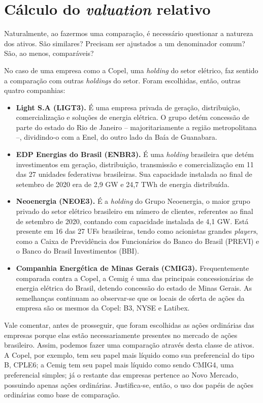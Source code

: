 \documentclass[grad,numbers]{coppe}
\providecommand{\tightlist}{%
  \setlength{\itemsep}{0pt}\setlength{\parskip}{0pt}}
\begin{document}
  \hypertarget{cuxe1lculo-do-valuation-relativo}{%
  \section{\texorpdfstring{Cálculo do \emph{valuation} relativo}{Cálculo do valuation relativo}}\label{cuxe1lculo-do-valuation-relativo}}

  Naturalmente, ao fazermos uma comparação, é necessário questionar a natureza dos ativos. São similares? Precisam ser ajustados a um denominador comum? São, ao menos, comparáveis?

  No caso de uma empresa como a Copel, uma \emph{holding} do setor elétrico, faz sentido a comparação com outras \emph{holdings} do setor. Foram escolhidas, então, outras quatro companhias:
  \begin{itemize}
  \tightlist
  \item
    \textbf{Light S.A (LIGT3).} É uma empresa privada de geração, distribuição, comercialização e soluções de energia elétrica. O grupo detém concessão de parte do estado do Rio de Janeiro -- majoritariamente a região metropolitana --, dividindo-o com a Enel, do outro lado da Baía de Guanabara.
  \item
    \textbf{EDP Energias do Brasil (ENBR3).} É uma \emph{holding} brasileira que detém investimentos em geração, distribuição, transmissão e comercialização em 11 das 27 unidades federativas brasileiras. Sua capacidade instalada ao final de setembro de 2020 era de 2,9 GW e 24,7 TWh de energia distribuída.
  \item
    \textbf{Neoenergia (NEOE3).} É a \emph{holding} do Grupo Neoenergia, o maior grupo privado do setor elétrico brasileiro em número de clientes, referentes ao final de setembro de 2020, contando com capacidade instalada de 4,1 GW. Está presente em 16 das 27 UFs brasileiras, tendo como acionistas grandes \emph{players}, como a Caixa de Previdência dos Funcionários do Banco do Brasil (PREVI) e o Banco do Brasil Investimentos (BBI).
  \item
    \textbf{Companhia Energética de Minas Gerais (CMIG3).} Frequentemente comparada contra a Copel, a Cemig é uma das principais concessionárias de energia elétrica do Brasil, detendo concessão do estado de Minas Gerais. As semelhanças continuam ao observar-se que os locais de oferta de ações da empresa são os mesmos da Copel: B3, NYSE e Latibex.
  \end{itemize}
  Vale comentar, antes de prosseguir, que foram escolhidas as ações ordinárias das empresas porque elas estão necessariamente presentes no mercado de ações brasileiro. Assim, podemos fazer uma comparação através desta classe de ativos. A Copel, por exemplo, tem seu papel mais líquido como sua preferencial do tipo B, CPLE6; a Cemig tem seu papel mais líquido como sendo CMIG4, uma preferencial simples; já o restante das empresas pertence ao Novo Mercado, possuindo apenas ações ordinárias. Justifica-se, então, o uso dos papéis de ações ordinárias como base de comparação.
\end{document}
